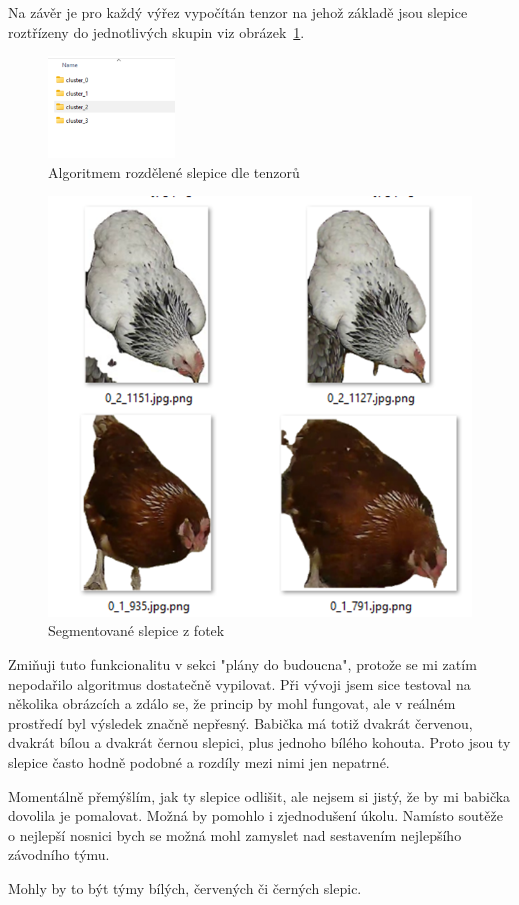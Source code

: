 Na závěr je pro každý výřez vypočítán tenzor na jehož základě jsou slepice roztřízeny do jednotlivých skupin viz obrázek~\ref{fig:chicks_in_clusters}.

\begin{figure}[H]
    \centering
    \includegraphics[width=0.3\textwidth]{img/chicks_in_clusters}
    \caption{Algoritmem rozdělené slepice dle tenzorů}
    \label{fig:chicks_in_clusters}
\end{figure}
\begin{figure}[h]
    \centering
    \includegraphics[width=\textwidth]{img/segmented_chicks}
    \caption{Segmentované slepice z fotek}
    \label{fig:segmented_chicks}
\end{figure}


Zmiňuji tuto funkcionalitu v sekci "plány do budoucna", protože se mi zatím nepodařilo algoritmus dostatečně vypilovat.
Při vývoji jsem sice testoval na několika obrázcích a zdálo se, že princip by mohl fungovat, ale v reálném prostředí byl výsledek značně nepřesný.
Babička má totiž dvakrát červenou, dvakrát bílou a dvakrát černou slepici, plus jednoho bílého kohouta.
Proto jsou ty slepice často hodně podobné a rozdíly mezi nimi jen nepatrné.

Momentálně přemýšlím, jak ty slepice odlišit, ale nejsem si jistý, že by mi babička dovolila je pomalovat.
Možná by pomohlo i zjednodušení úkolu.
Namísto soutěže o nejlepší nosnici bych se možná mohl zamyslet nad sestavením nejlepšího závodního týmu.

Mohly by to být týmy bílých, červených či černých slepic.





